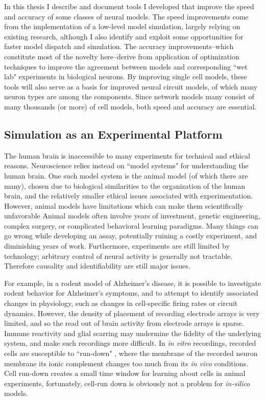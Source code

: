 In this thesis I describe and document tools I developed that improve the speed and accuracy of some classes of neural models.
The speed improvements come from the implementation of a low-level model simulation, largely relying on existing research, although I also identify and exploit some opportunities for faster model dispatch and simulation.
The accuracy improvements--which constitute most of the novelty here--derive from application of optimization techniques to improve the agreement between models and corresponding ``wet lab" experiments in biological neurons.
By improving single cell models, these tools will also serve as a basis for improved neural circuit models, of which many neuron types are among the components.
Since network models many consist of many thousands (or more) of cell models, both speed and accuracy are essential.
\\

\subsection{Simulation as an Experimental Platform}
The human brain is inaccessible to many experiments for technical and ethical reasons.
Neuroscience relies instead on ``model systems" for understanding the human brain.
One such model system is the animal model (of which there are many), chosen due to biological similarities to the organization of the human brain, and the relatively smaller ethical issues associated with experimentation.
However, animal models have limitations which can make them scientifically unfavorable
Animal models often involve years of investment, genetic engineering, complex surgery, or complicated behavioral learning paradigms.
Many things can go wrong while developing an assay, potentially ruining a costly experiment, and diminishing years of work.
Furthermore, experiments are still limited by technology; arbitrary control of neural activity is generally not tractable.
Therefore causality and identifiability are still major issues.

For example, in a rodent model of Alzheimer's disease, it is possible to investigate rodent behavior for Alzheimer's symptoms, and to attempt to identify associated changes in physiology, such as changes in cell-specific firing rates or circuit dynamics.
However, the density of placement of recording electrode arrays is very limited, and so the read out of brain activity from electrode arrays is sparse.
Immune reactivity and glial scarring may undermine the fidelity of the underlying system, and make such recordings more difficult.
In \emph{in vitro} recordings, recorded cells are susceptible to ``run-down" \citep{colquhoun1994ion}, where the membrane of the recorded neuron membrane its ionic complement changes too much from its \emph{in vivo} conditions. 
Cell run-down creates a small time window for learning about cells in animal experiments, fortunately, cell-run down is obviously not a problem for \emph{in-silico} models.

